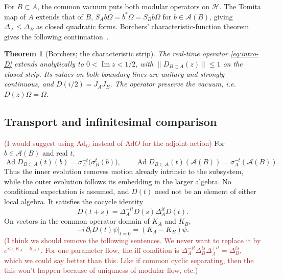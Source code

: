 \documentclass[a4paper,11pt]{article}
\newtheorem{theorem}{Theorem}
\theoremstyle{definition}
\newcommand{\KL}[1]{\textcolor{brown}{#1}}
\begin{document}
For $B\subset A$, the common vacuum puts both modular operators on $\mathcal H$. The Tomita map of $A$ extends that of $B$, $S_Ab\Omega=b^*\Omega=S_Bb\Omega$ for $b\in\mathcal A(B)$, giving $\Delta_A\le\Delta_B$ as closed quadratic forms. Borchers' characteristic-function theorem gives the following continuation~\cite{revolutionizing}.

\begin{theorem}[Borchers; the characteristic strip]\label{prop:strip}
The real-time operator \eqref{eq:intro-D} extends analytically to $0<\operatorname{Im}z<1/2$, with $\|D_{B\subset A}(z)\|\le1$ on the closed strip. Its values on both boundary lines are unitary and strongly continuous, and $D(i/2)=J_AJ_B$. The operator preserve the vacuum, i.e. $D(z)\Omega=\Omega$.
\end{theorem}

\subsection{Transport and infinitesimal comparison}
\KL{(I would suggest using $\text{Ad}_O$ instead of $\text{Ad}O$ for the adjoint action)}
For $b\in\mathcal A(B)$ and real $t$,
\begin{equation}
 \operatorname{Ad}D_{B\subset A}(t)(b)=\sigma_A^{-t}\bigl(\sigma_B^t(b)\bigr),
 \qquad
 \operatorname{Ad}D_{B\subset A}(t)(\mathcal A(B))=\sigma_A^{-t}(\mathcal A(B)).
 \label{eq:transport}
\end{equation}
Thus the inner evolution removes motion already intrinsic to the subsystem, while the outer evolution follows its embedding in the larger algebra. No conditional expectation is assumed, and $D(t)$ need not be an element of either local algebra. It satisfies the cocycle identity
\begin{equation}
 D(t+s)=\Delta_A^{-it}D(s)\Delta_A^{it}D(t).
 \label{eq:cocycle}
\end{equation}
On vectors in the common operator domain of $K_A$ and $K_B$,
\begin{equation}
 -i\,\partial_tD(t)\psi\big|_{t=0}=(K_A-K_B)\psi .
 \label{eq:generator}
\end{equation}
\KL{(I think we should remove the following sentences. We never want to replace it by $e^{it(K_A-K_B)}$. For one parameter flow, the iff condition is $\Delta_A^{-it}\Delta_B^{is}\Delta_A^{+it} = \Delta_B^{is}$, which we could say better than this. Like if common cyclic separating, then the this won't happen because of uniquness of modular flow, etc.)}
\end{document}
